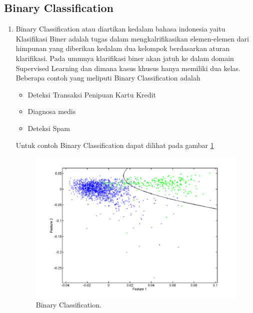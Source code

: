 \subsection{Binary Classification}
\begin{enumerate}
\item Binary Classification atau diartikan kedalam bahasa indonesia yaitu Klasifikasi Biner adalah tugas dalam mengkalrifikasikan elemen-elemen dari himpunan yang diberikan kedalam dua kelompok berdasarkan aturan klarifikasi. Pada ummnya klarifikasi biner akan jatuh ke dalam domain Supervised Learning dan dimana kasus khusus hanya memiliki dua kelas. Beberapa contoh yang meliputi Binary Classification adalah \begin{itemize}
		\item Deteksi Transaksi Penipuan Kartu Kredit
		\item Diagnosa medis
		\item Deteksi Spam
	\end{itemize}
\subitem Untuk contoh Binary Classification dapat dilihat pada gambar \ref{YNBC}
		\begin{figure}[ht]
		\centerline{\includegraphics[width=1\textwidth]{figures/YN/YN50.png}}
		\caption{Binary Classification.}
		\label{YNBC}
		\end{figure}
 \end{enumerate}

